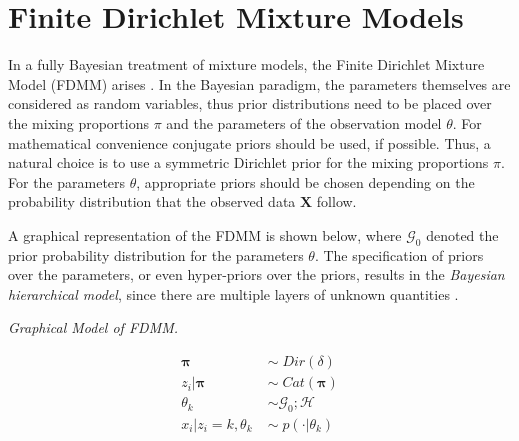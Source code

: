 \section{Finite Dirichlet Mixture Models} \label{fdmm-s}
In a fully Bayesian treatment of mixture models, the Finite Dirichlet Mixture Model (FDMM) arises \citep{Diebolt1994}. In the Bayesian paradigm, the parameters themselves are considered as random variables, thus prior distributions need to be placed over the mixing proportions $\pi$ and the parameters of the observation model $\theta$. For mathematical convenience conjugate priors should be used, if possible. Thus, a natural choice is to use a symmetric Dirichlet prior for the mixing proportions $\pi$. For the parameters $\theta$, appropriate priors should be chosen depending on the probability distribution that the observed data $\mathbf{X}$ follow.

A graphical representation of the FDMM is shown below, where $\mathcal{G}_{0}$ denoted the prior probability distribution for the parameters $\theta$. The specification of priors over the parameters, or even hyper-priors over the priors, results in the \emph{Bayesian hierarchical model}, since there are multiple layers of unknown quantities \cite{Richardson1997}. 

\begin{minipage}{0.6\textwidth}%
  \hfill
  \begin{center}
	
	\emph{Graphical Model of FDMM.}
  \end{center}
\end{minipage}
\begin{minipage}{0.1\textwidth}%
  \begin{equation*}
  	\begin{aligned}
  		\mathbf{\pi} \; & \sim \; Dir(\delta) \\
  		z_{i}|\mathbf{\pi} \; & \sim \; Cat(\mathbf{\pi}) \\
  		\theta_{k} \; & \sim \mathcal{G}_{0}; \mathcal{H} \\
  		x_{i}|z_{i}=k,\theta_{k} \; & \sim \; p(\cdot | \theta_{k})  
  	\end{aligned} 
  \end{equation*} 
\end{minipage}


